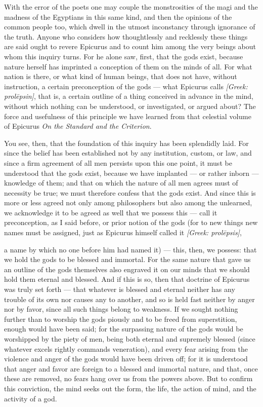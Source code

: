  With the error of the poets one may couple the monstrosities of the magi and the madness of the Egyptians in this same kind, and then the opinions of the common people too, which dwell in the utmost inconstancy through ignorance of the truth. Anyone who considers how thoughtlessly and recklessly these things are said ought to revere Epicurus and to count him among the very beings about whom this inquiry turns. For he alone saw, first, that the gods exist, because nature herself has imprinted a conception of them on the minds of all. For what nation is there, or what kind of human beings, that does not have, without instruction, a certain preconception of the gods — what Epicurus calls \textit{[Greek: prolēpsin]}, that is, a certain outline of a thing conceived in advance in the mind, without which nothing can be understood, or investigated, or argued about? The force and usefulness of this principle we have learned from that celestial volume of Epicurus \textit{On the Standard and the Criterion}.

 You see, then, that the foundation of this inquiry has been splendidly laid. For since the belief has been established not by any institution, custom, or law, and since a firm agreement of all men persists upon this one point, it must be understood that the gods exist, because we have implanted — or rather inborn — knowledge of them; and that on which the nature of all men agrees must of necessity be true; we must therefore confess that the gods exist. And since this is more or less agreed not only among philosophers but also among the unlearned, we acknowledge it to be agreed as well that we possess this — call it preconception, as I said before, or prior notion of the gods (for to new things new names must be assigned, just as Epicurus himself called it \textit{[Greek: prolēpsis]},

 a name by which no one before him had named it) — this, then, we possess: that we hold the gods to be blessed and immortal. For the same nature that gave us an outline of the gods themselves also engraved it on our minds that we should hold them eternal and blessed. And if this is so, then that doctrine of Epicurus was truly set forth — that whatever is blessed and eternal neither has any trouble of its own nor causes any to another, and so is held fast neither by anger nor by favor, since all such things belong to weakness. If we sought nothing further than to worship the gods piously and to be freed from superstition, enough would have been said; for the surpassing nature of the gods would be worshipped by the piety of men, being both eternal and supremely blessed (since whatever excels rightly commands veneration), and every fear arising from the violence and anger of the gods would have been driven off; for it is understood that anger and favor are foreign to a blessed and immortal nature, and that, once these are removed, no fears hang over us from the powers above. But to confirm this conviction, the mind seeks out the form, the life, the action of mind, and the activity of a god.

